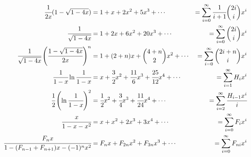 {\begin{align*}
\cfrac{1}{2x}(1 - \sqrt{1-4x})
          &=  1 + x + 2 x^2 + 5 x^3 +  \cdots
                                &=  \sum_{i=0}^\infty \cfrac{1}{i+1}{2i \choose i}x^i \\
\cfrac{1}{\sqrt{1-4x}}
          &=  1 + 2 x + 6 x^2 + 20 x^3 + \cdots
                                &=  \sum_{i=0}^\infty {2i \choose i}x^i \\
\cfrac{1}{\sqrt{1-4x}}\left(\cfrac{1 - \sqrt{1-4x}}{2x}\right)^n
          &=  1 + (2+n)x + {4+n \choose 2} x^2 + \cdots
                                &=  \sum_{i=0}^\infty {2i+n \choose i}x^i \\
\cfrac{1}{1-x}\ln\cfrac{1}{1 - x}
          &=  x + \cfrac{3}{2} x^2 + \cfrac{11}{6} x^3 + \cfrac{25}{12} x^4 + \cdots
                                &=  \sum_{i=1}^\infty H_i x^i \\
\cfrac{1}{2}\left(\ln\cfrac{1}{1- x}\right)^2
          &=  \cfrac{1}{2} x^2 + \cfrac{3}{4} x^3 + \cfrac{11}{24} x^4 + \cdots
                                &=  \sum_{i=2}^\infty \cfrac{H_{i-1} x^i}{i} \\
\cfrac{x}{1 - x - x^2}
          &=  x + x^2 + 2 x^3 + 3 x^4 +  \cdots
                                &=  \sum_{i=0}^\infty F_i x^i \\
\cfrac{F_n x}{1 - (F_{n-1} + F_{n+1})x - (-1)^n x^2}
          &=  F_n x + F_{2n} x^2 + F_{3n} x^3 + \cdots
                                &=  \sum_{i=0}^\infty F_{ni} x^i
\end{align*}
}
